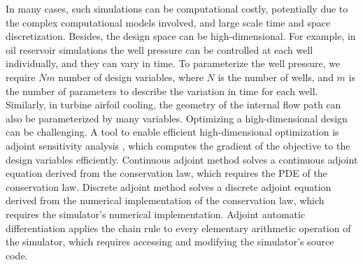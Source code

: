 \documentclass[a4paper,onecolumn]{article}
\theoremstyle{remark}
\begin{document}
\noindent 
In many cases, such simulations can be computational costly, potentially due to the complex computational models involved, and
large scale time and space discretization. Besides, the design space can be high-dimensional. 
For example, in oil reservoir simulations the well pressure can be controlled at each well
individually, and they can vary in time.
To parameterize the well pressure, we require $Nm$ number of design variables, where $N$ is the number of wells,
and $m$ is the number of parameters to describe the variation in time for each well.
Similarly, in turbine airfoil cooling,
the geometry of the internal flow path can also be parameterized by many variables.
Optimizing a high-dimensional design
can be challenging.
A tool to enable efficient high-dimensional optimization is adjoint sensitivity analysis
\cite{cont discretize adjoint}
, which computes the gradient of the objective to the design variables efficiently. 
Continuous adjoint method solves a continuous adjoint equation derived from the conservation law, which 
requires the PDE of the conservation law.
Discrete adjoint method solves a discrete adjoint equation derived 
from the numerical implementation of the conservation law,
which requires the simulator's numerical implementation.
Adjoint automatic differentiation applies the chain rule to every elementary arithmetic operation of the simulator,
which requires accessing and modifying the simulator's source code.\\
\end{document}
